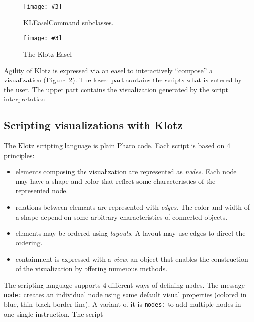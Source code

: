 \documentclass{sig-alternate}
\newcommand{\ct}{\lstinline[backgroundcolor=\color{white},basicstyle=\footnotesize\ttfamily]}
\newcommand{\ab}[1]{\nb{Alexandre}{blue}{#1}}
\newcommand{\fig}[4]{
	\begin{figure}[#1]
		\centering
		\texttt{[image: \#3]}
		\caption{\label{fig:#3}#4}
	\end{figure}}
\newcommand{\seclabel}[1]{\label{sec:#1}}
\newcommand{\figref}[1]{Figure~\ref{fig:#1}}
\begin{document}
\fig{h}{0.4}{figure1.png}{KLEaselCommand subclasses.}

\fig{h}{0.5}{klotz}{The Klotz Easel}

Agility of Klotz is expressed via an easel to interactively ``compose'' a visualization (\figref{klotz}). The lower part contains the scripts what is entered by the user. The upper part contains the visualization generated by the script interpretation.



\subsection{Scripting visualizations with Klotz} \seclabel{scripting}

The Klotz scripting language is plain Pharo code. Each script is based on 4 principles:

\begin{itemize}
\item elements composing the visualization are represented as \emph{nodes}. Each node may have a shape and color that reflect some characteristics of the represented node.
\item relations between elements are represented with \emph{edges}. The color and width of a shape depend on some arbitrary characteristics of connected objects.
\item elements may be ordered using \emph{layouts}. A layout may use edges to direct the ordering.
\item containment is expressed with a \emph{view}, an object that enables the construction of the visualization by offering numerous methods.%
\end{itemize}


The scripting language supports 4 different ways of defining nodes. 
The message \ct{node:} creates an individual node using some default visual properties (colored in blue, thin black border line). A variant of it is \ct{nodes:} to add multiple nodes in one single instruction. The script 
\end{document}
